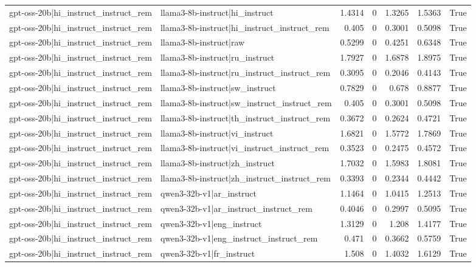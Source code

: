\begin{table}
\begin{tabular}{l l r r r r l}
gpt-oss-20b|hi_instruct_instruct_rem & llama3-8b-instruct|hi_instruct & 1.4314 & 0 & 1.3265 & 1.5363 & True \\
gpt-oss-20b|hi_instruct_instruct_rem & llama3-8b-instruct|hi_instruct_instruct_rem & 0.405 & 0 & 0.3001 & 0.5098 & True \\
gpt-oss-20b|hi_instruct_instruct_rem & llama3-8b-instruct|raw & 0.5299 & 0 & 0.4251 & 0.6348 & True \\
gpt-oss-20b|hi_instruct_instruct_rem & llama3-8b-instruct|ru_instruct & 1.7927 & 0 & 1.6878 & 1.8975 & True \\
gpt-oss-20b|hi_instruct_instruct_rem & llama3-8b-instruct|ru_instruct_instruct_rem & 0.3095 & 0 & 0.2046 & 0.4143 & True \\
gpt-oss-20b|hi_instruct_instruct_rem & llama3-8b-instruct|sw_instruct & 0.7829 & 0 & 0.678 & 0.8877 & True \\
gpt-oss-20b|hi_instruct_instruct_rem & llama3-8b-instruct|sw_instruct_instruct_rem & 0.405 & 0 & 0.3001 & 0.5098 & True \\
gpt-oss-20b|hi_instruct_instruct_rem & llama3-8b-instruct|th_instruct_instruct_rem & 0.3672 & 0 & 0.2624 & 0.4721 & True \\
gpt-oss-20b|hi_instruct_instruct_rem & llama3-8b-instruct|vi_instruct & 1.6821 & 0 & 1.5772 & 1.7869 & True \\
gpt-oss-20b|hi_instruct_instruct_rem & llama3-8b-instruct|vi_instruct_instruct_rem & 0.3523 & 0 & 0.2475 & 0.4572 & True \\
gpt-oss-20b|hi_instruct_instruct_rem & llama3-8b-instruct|zh_instruct & 1.7032 & 0 & 1.5983 & 1.8081 & True \\
gpt-oss-20b|hi_instruct_instruct_rem & llama3-8b-instruct|zh_instruct_instruct_rem & 0.3393 & 0 & 0.2344 & 0.4442 & True \\
gpt-oss-20b|hi_instruct_instruct_rem & qwen3-32b-v1|ar_instruct & 1.1464 & 0 & 1.0415 & 1.2513 & True \\
gpt-oss-20b|hi_instruct_instruct_rem & qwen3-32b-v1|ar_instruct_instruct_rem & 0.4046 & 0 & 0.2997 & 0.5095 & True \\
gpt-oss-20b|hi_instruct_instruct_rem & qwen3-32b-v1|eng_instruct & 1.3129 & 0 & 1.208 & 1.4177 & True \\
gpt-oss-20b|hi_instruct_instruct_rem & qwen3-32b-v1|eng_instruct_instruct_rem & 0.471 & 0 & 0.3662 & 0.5759 & True \\
gpt-oss-20b|hi_instruct_instruct_rem & qwen3-32b-v1|fr_instruct & 1.508 & 0 & 1.4032 & 1.6129 & True \\

\end{tabular}
\end{table}

